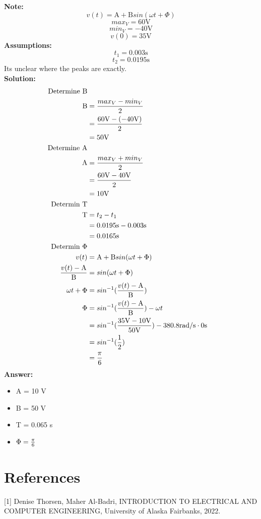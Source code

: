 \documentclass{article}
\begin{document}
\begin{addmargin}[1.5cm]{0em}
	\noindent\textbf{Note:}
	\begin{equation}
		v(t) = \text{A} + \text{B} sin(\omega t + \Phi)
	\end{equation}
	\[ max_V = 60 \text{V} \]
	\[ min_V = -40 \text{V} \]
	\[ v(0) = 35 \text{V} \]
	\noindent\textbf{Assumptions:}
	\[ t_1 = 0.003 \text{s} \]
	\[ t_2 = 0.0195 \text{s} \]
	Its unclear where the peaks are exactly. \\
	\noindent\textbf{Solution:}
	\begingroup
	\allowdisplaybreaks
	\begin{align*}
		\text{Determine B} \\
		\text{B} &= {max_V - min_V \over 2} \\
		         &= {60 \text{V} - (-40 \text{V}) \over 2} \\
		         &= 50 \text{V} \\
		\text{Determine A} \\
		\text{A} &= {max_V + min_V \over 2} \\
		         &= {60 \text{V} - 40 \text{V} \over 2} \\
		         &= 10 \text{V} \\
		\text{Determin T} \\
		\text{T} &= t_2 - t_1 \\
		         &= 0.0195 \text{s} - 0.003 \text{s} \\
		         &= 0.0165 \text{s} \\
		\text{Determin $\Phi$} \\
		    v(t) &= \text{A} + \text{B} sin(\omega t + \Phi) \\
		{v(t) - \text{A} \over \text{B} } &= sin(\omega t + \Phi) \\
		\omega t + \Phi &= sin^{-1}({v(t) - \text{A} \over \text{B} }) \\
		    \Phi &= sin^{-1}({v(t) - \text{A} \over \text{B} }) - \omega t \\
		         &= sin^{-1}({35 \text{V} - 10 \text{V} \over 50 \text{V}}) - 380.8 \text{rad} / \text{s} \cdot 0 \text{s} \\
		         &= sin^{-1}({1 \over 2}) \\
		         &= {\pi \over 6} \\
	\end{align*}
	\endgroup
	\noindent\textbf{Answer:}
	\begin{itemize}
		\item A = 10 V
		\item B = 50 V
		\item T = 0.065 s
		\item $\Phi = {\pi \over 6}$
	\end{itemize}
\end{addmargin}
\newpage
\section{References}
[1] Denise Thorsen, Maher Al-Badri, INTRODUCTION TO ELECTRICAL AND COMPUTER ENGINEERING, University of Alaska Fairbanks, 2022.
\end{document}
